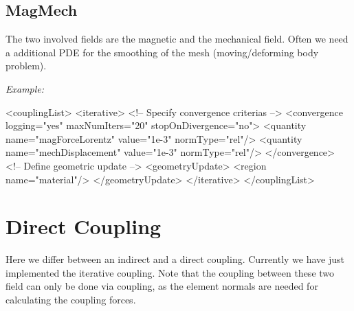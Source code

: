 \subsection{MagMech}
The two involved fields are the magnetic and the mechanical field.
Often we need a additional PDE for the smoothing of the mesh (moving/deforming 
body problem).

\bigskip
\noindent
{\it Example:}

\begin{xmllisting}
     <couplingList>
       <iterative>
         <!-- Specify convergence criterias -->
         <convergence logging="yes" maxNumIters="20" stopOnDivergence="no">
           <quantity name="magForceLorentz" value="1e-3" normType="rel"/>
           <quantity name="mechDisplacement" value="1e-3" normType="rel"/>
         </convergence>
         <!-- Define geometric update -->
         <geometryUpdate>
           <region name="material"/>
         </geometryUpdate>
       </iterative>
     </couplingList>
\end{xmllisting}




%
%
\section{Direct Coupling}
Here we differ between an indirect and a direct coupling. Currently we have
just implemented the iterative coupling. Note that the coupling
between these two field can only be done via  coupling,
as the element normals are needed for calculating the coupling forces.

